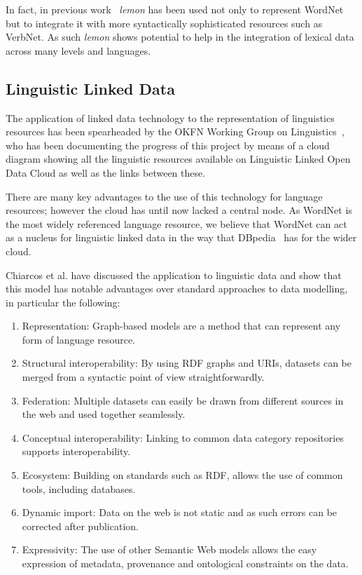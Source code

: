 \documentclass[10pt, a4paper]{article}
\newcommand{\lemon}[0]{\emph{lemon}}
\begin{document}
In fact, in previous work~\cite{eckle2014lemonuby} \lemon{} has been used not only to
represent WordNet but to integrate it with more syntactically sophisticated
resources such as VerbNet. As such \lemon{} shows potential to help in the
integration of lexical data across many levels and languages.

\subsection{Linguistic Linked Data}

The application of linked data technology to the representation of linguistics
resources has been spearheaded by the OKFN Working Group on Linguistics~\cite{chiarcos2011towards},
who has been documenting the progress of this project by means of a cloud
diagram showing all the linguistic resources available on Linguistic Linked Open Data Cloud as well as the links between these.

There are many key advantages to the use
of this technology for language resources; however the cloud has until now
lacked a central node. As WordNet is the most widely referenced language
resource, we believe that WordNet can act as a nucleus for linguistic linked data
in the way that DBpedia~\cite{auer2007dbpedia} has for the wider cloud.

Chiarcos et al. \cite{chiarcos2013towards} have discussed the
application to linguistic data and show that this model has notable
advantages over standard approaches to data modelling, in particular the following:

\begin{enumerate}
    \item Representation: Graph-based models are a method that can represent any
        form of language resource.
    \item Structural interoperability: By using RDF graphs and URIs, datasets can
        be merged from a syntactic point of view straightforwardly.
    \item Federation: Multiple datasets can easily be drawn from different
        sources in the web and used together seamlessly.
    \item Conceptual interoperability: Linking to common data category
        repositories supports interoperability.
        \item Ecosystem: Building on standards such as RDF, allows the use of common
        tools, including databases.
    \item Dynamic import: Data on the web is not static and as such errors can
        be corrected after publication.
    \item Expressivity: The use of other Semantic Web models allows the easy
        expression of metadata, provenance and ontological constraints on the
        data.
\end{enumerate}
\end{document}
